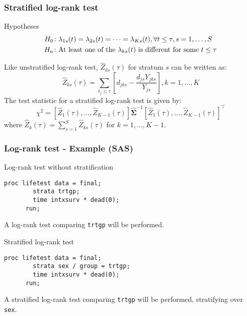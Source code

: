 \documentclass[11pt, aspectratio = 169]{beamer}
\begin{document}
\begin{frame}
  \frametitle{Stratified log-rank test}
  \begin{block}{Hypotheses}
    \begin{equation*}
      \begin{split}
        H_0&\colon \lambda_{1s}(t) = \lambda_{2s}(t) = \dotsb = \lambda_{Ks}(t), \forall t \le \tau, s = 1,\dotsc,S\\
        H_a&\colon \textnormal{At least one of the}\ \lambda_{ks}(t)\ \textnormal{is different for some}\ t \le \tau
      \end{split}
    \end{equation*}
  \end{block}
  Like unstratified log-rank test, $\hat{Z}_{ks}(\tau)$ for stratum $s$ can be written as:
  \begin{equation*}
    \hat{Z}_{ks}(\tau) = \sum_{t_j \le \tau} \left[d_{jks} - \frac{d_{js} Y_{jks}}{Y_{js}}\right], k = 1,\dotsc,K
  \end{equation*}
  The test statistic for a stratified log-rank test is given by:
  \begin{equation*}
    \chi^2 = \left[\hat{Z}_1(\tau),\dotsc,\hat{Z}_{K-1}(\tau)\right] \hat{\boldsymbol{\Sigma}}^{-1} \left[\hat{Z}_1(\tau),\dotsc,\hat{Z}_{K-1}(\tau)\right]^\top
  \end{equation*}
  where $\hat{Z}_k(\tau) = \sum_{s = 1}^{S}\hat{Z}_{ks}(\tau)$ for $k = 1,\dotsc,K - 1$.
\end{frame}

\begin{frame}[fragile]
  \frametitle{Log-rank test - Example (SAS)}
  \begin{block}{Log-rank test without stratification}
    \begin{lstlisting}[gobble = 6]
      proc lifetest data = final;
        strata trtgp;
        time intxsurv * dead(0);
      run;
    \end{lstlisting}
    A log-rank test comparing \texttt{trtgp} will be performed.
  \end{block}
  \begin{block}{Stratified log-rank test}
    \begin{lstlisting}[gobble = 6]
      proc lifetest data = final;
        strata sex / group = trtgp;
        time intxsurv * dead(0);
      run;
    \end{lstlisting}
    A stratified log-rank test comparing \texttt{trtgp} will be performed, stratifying over \texttt{sex}.
  \end{block}
\end{frame}
\end{document}
